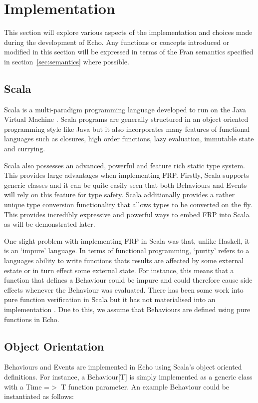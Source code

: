 \chapter{Implementation}
  This section will explore various aspects of the implementation and choices made during the development
  of Echo. Any functions or concepts introduced or modified in this section will be expressed in terms
  of the Fran semantics specified in section~\ref{sec:semantics} where possible.
  
  \section{Scala}
    Scala is a multi-paradigm programming language developed to run on the Java Virtual Machine \cite{Odersky2004}. Scala 
    programs are
    generally structured in an object oriented programming style like Java but it also incorporates many features of
    functional languages such as closures, high order functions, lazy evaluation, immutable state and currying.

    Scala also possesses an advanced, powerful and feature rich static type system. This provides large
    advantages when implementing FRP. Firstly, Scala supports generic classes and it can be quite easily seen
    that both Behaviours and Events will rely on this feature for type safety. Scala additionally provides
    a rather unique type conversion functionality that allows types to be converted on the fly. This provides
    incredibly expressive and powerful ways to embed FRP into Scala as will be demonstrated later.
    
    One slight problem with implementing FRP in Scala was that, unlike Haskell, it is an `impure'
    language. In terms of functional programming, `purity' refers to a languages ability to write functions
    thats results are affected by some external estate or in turn effect some external state. For instance,
    this means that a function that defines a Behaviour could be impure and could therefore cause side effects
    whenever the Behaviour was evaluated. There has been some work into pure function verification in Scala but it has not materialised into an  
    implementation \cite{Nordenberg}. Due to this, we assume that Behaviours are defined using pure functions in Echo.
    
  \section{Object Orientation}
    Behaviours and Events are implemented in
    Echo using Scala's object oriented definitions. For instance, a Behaviour[T] is simply
    implemented as a generic class with a Time =$>$ T function parameter. An example Behaviour
    could be instantiated as follows:

